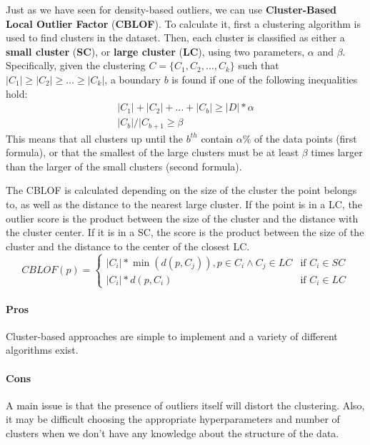 Just as we have seen for density-based outliers, we can use \textbf{Cluster-Based Local Outlier Factor} (\textbf{CBLOF}). To calculate it, first a clustering algorithm is used to find clusters in the dataset. Then, each cluster is classified as either a \textbf{small cluster} (\textbf{SC}), or \textbf{large cluster} (\textbf{LC}), using two parameters, $\alpha$ and $\beta$. Specifically, given the clustering $C = \{C_1, C_2, \dots, C_k \}$ such that $|C_1| \geq |C_2| \geq \dots \geq |C_k|$, a boundary $b$ is found if one of the following inequalities hold:
\begin{gather*}
    |C_1| + |C_2| + \dots + |C_b| \geq |D|*\alpha \\
    |C_b|/|C_{b+1} \geq \beta
\end{gather*}
This means that all clusters up until the $b^{th}$ contain $\alpha \%$ of the data points (first formula), or that the smallest of the large clusters must be at least $\beta$ times larger than the larger of the small clusters (second formula). 

The CBLOF is calculated depending on the size of the cluster the point belongs to, as well as the distance to the nearest large cluster. If the point is in a LC, the outlier score is the product between the size of the cluster and the distance with the cluster center. If it is in a SC, the score is the product between the size of the cluster and the distance to the center of the closest LC.
\begin{equation*}
    CBLOF(p) = \begin{cases}
        |C_i|*\min(d(p, C_j)), p \in C_i \land C_j \in LC & \text{if $C_i \in SC$} \\
        |C_i|*d(p, C_i) & \text{if $C_i \in LC$}
    \end{cases}
\end{equation*}

\paragraph{Pros} Cluster-based approaches are simple to implement and a variety of different algorithms exist.

\paragraph{Cons} A main issue is that the presence of outliers itself will distort the clustering. Also, it may be difficult choosing the appropriate hyperparameters and number of clusters when we don't have any knowledge about the structure of the data.

